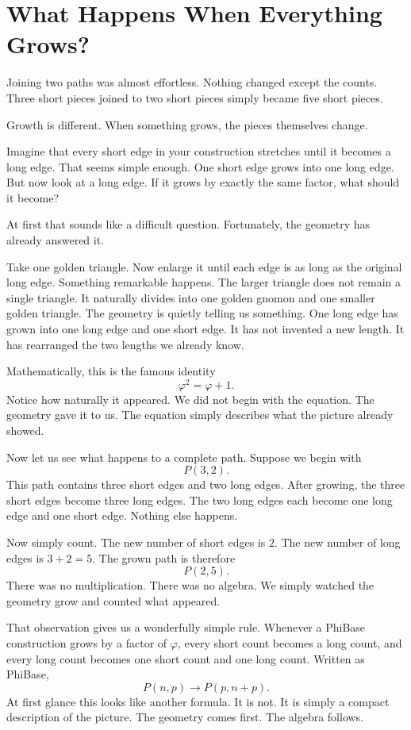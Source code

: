 \chapter{What Happens When Everything Grows?}
\label{stone:growing}

Joining two paths was almost effortless. Nothing changed except the counts. Three short pieces joined to two short pieces simply became five short pieces.

Growth is different. When something grows, the pieces themselves change.

Imagine that every short edge in your construction stretches until it becomes a long edge. That seems simple enough. One short edge grows into one long edge. But now look at a long edge. If it grows by exactly the same factor, what should it become?

At first that sounds like a difficult question. Fortunately, the geometry has already answered it.

Take one golden triangle. Now enlarge it until each edge is as long as the original long edge. Something remarkable happens. The larger triangle does not remain a single triangle. It naturally divides into one golden gnomon and one smaller golden triangle. The geometry is quietly telling us something. One long edge has grown into one long edge and one short edge. It has not invented a new length. It has rearranged the two lengths we already know.

Mathematically, this is the famous identity
\[
\varphi^2=\varphi+1.
\]
Notice how naturally it appeared. We did not begin with the equation. The geometry gave it to us. The equation simply describes what the picture already showed.

Now let us see what happens to a complete path. Suppose we begin with
\[
P(3,2).
\]
This path contains three short edges and two long edges. After growing, the three short edges become three long edges. The two long edges each become one long edge and one short edge. Nothing else happens.

Now simply count. The new number of short edges is \(2\). The new number of long edges is \(3+2=5\). The grown path is therefore
\[
P(2,5).
\]
There was no multiplication. There was no algebra. We simply watched the geometry grow and counted what appeared.

That observation gives us a wonderfully simple rule. Whenever a PhiBase construction grows by a factor of \(\varphi\), every short count becomes a long count, and every long count becomes one short count and one long count. Written as PhiBase,
\[
P(n,p) \longrightarrow P(p,n+p).
\]
At first glance this looks like another formula. It is not. It is simply a compact description of the picture. The geometry comes first. The algebra follows.

